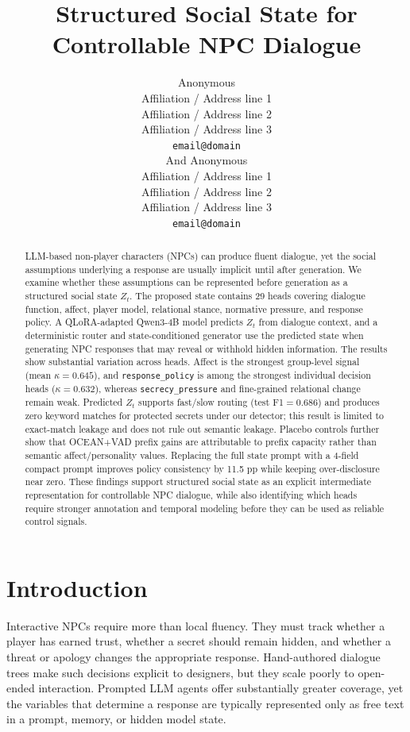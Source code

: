 \documentclass[11pt]{article}
\title{Structured Social State for Controllable NPC Dialogue}
\author{Anonymous \\
  Affiliation / Address line 1 \\
  Affiliation / Address line 2 \\
  Affiliation / Address line 3 \\
  \texttt{email@domain} \\And
  Anonymous \\
  Affiliation / Address line 1 \\
  Affiliation / Address line 2 \\
  Affiliation / Address line 3 \\
  \texttt{email@domain} \\}
\begin{document}
\maketitle

\begin{abstract}
LLM-based non-player characters (NPCs) can produce fluent dialogue, yet the social assumptions underlying a response are usually implicit until after generation. We examine whether these assumptions can be represented before generation as a structured social state $Z_t$. The proposed state contains 29 heads covering dialogue function, affect, player model, relational stance, normative pressure, and response policy. A QLoRA-adapted Qwen3-4B model predicts $Z_t$ from dialogue context, and a deterministic router and state-conditioned generator use the predicted state when generating NPC responses that may reveal or withhold hidden information. The results show substantial variation across heads. Affect is the strongest group-level signal (mean $\kappa{=}0.645$), and \texttt{response\_policy} is among the strongest individual decision heads ($\kappa{=}0.632$), whereas \texttt{secrecy\_pressure} and fine-grained relational change remain weak. Predicted $Z_t$ supports fast/slow routing (test F1$=0.686$) and produces zero keyword matches for protected secrets under our detector; this result is limited to exact-match leakage and does not rule out semantic leakage. Placebo controls further show that OCEAN+VAD prefix gains are attributable to prefix capacity rather than semantic affect/personality values. Replacing the full state prompt with a 4-field compact prompt improves policy consistency by 11.5 pp while keeping over-disclosure near zero. These findings support structured social state as an explicit intermediate representation for controllable NPC dialogue, while also identifying which heads require stronger annotation and temporal modeling before they can be used as reliable control signals.
\end{abstract}

\section{Introduction}
\label{sec:intro}

Interactive NPCs require more than local fluency. They must track whether a player has earned trust, whether a secret should remain hidden, and whether a threat or apology changes the appropriate response. Hand-authored dialogue trees make such decisions explicit to designers, but they scale poorly to open-ended interaction. Prompted LLM agents offer substantially greater coverage, yet the variables that determine a response are typically represented only as free text in a prompt, memory, or hidden model state.
\end{document}
